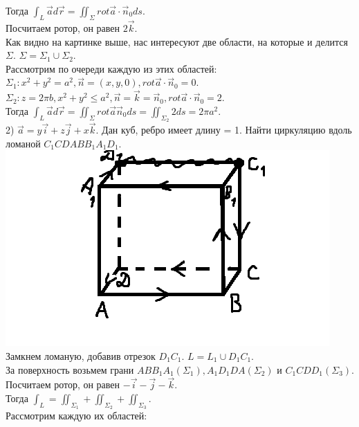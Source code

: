 \documentclass[12pt]{article}
\begin{document}
Тогда $\int_L \overrightarrow{a} d \overrightarrow{r} = \iint_{\Sigma} rot \overrightarrow{a} \cdot \overrightarrow{n}_0 ds$.\\
Посчитаем ротор, он равен $2 \overrightarrow{k}$.\\
Как видно на картинке выше, нас интересуют две области, на которые и делится $\Sigma$. $\Sigma = \Sigma_1 \cup \Sigma_2$.\\
Рассмотрим по очереди каждую из этих областей:\\
$\Sigma_1 : x^2 + y^2 = a^2, \overrightarrow{n} = (x,y,0), rot \overrightarrow{a} \cdot \overrightarrow{n}_0 = 0$.\\
$\Sigma_2 : z = 2 \pi b, x^2 + y^2 \leq a^2, \overrightarrow{n} = \overrightarrow{k} = \overrightarrow{n}_0, rot \overrightarrow{a} \cdot \overrightarrow{n}_0 = 2$.\\
Тогда $\int_L \overrightarrow{a} d \overrightarrow{r} = \iint_{\Sigma} rot \overrightarrow{a} \overrightarrow{n}_0 ds = \iint_{\Sigma_2} 2 ds = 2 \pi a^2$.\\
2) $\overrightarrow{a} = y \overrightarrow{i} + z \overrightarrow{j} + x \overrightarrow{k}$. Дан куб, ребро имеет длину = 1. Найти циркуляцию вдоль ломаной $C_1CDABB_1A_1D_1$.\\
\includegraphics{stokesExample2}\\
Замкнем ломаную, добавив отрезок $D_1C_1$. $L = L_1 \cup D_1C_1$.\\
За поверхность возьмем грани $ABB_1A_1 (\Sigma_1), A_1D_1DA(\Sigma_2)$ и $C_1CDD_1 (\Sigma_3)$.\\
Посчитаем ротор, он равен $-\overrightarrow{i}-\overrightarrow{j}-\overrightarrow{k}$.\\
Тогда $\int_L = \iint_{\Sigma_1} + \iint_{\Sigma_2} + \iint_{\Sigma_3}$.\\
Рассмотрим каждую их областей:\\
\end{document}
